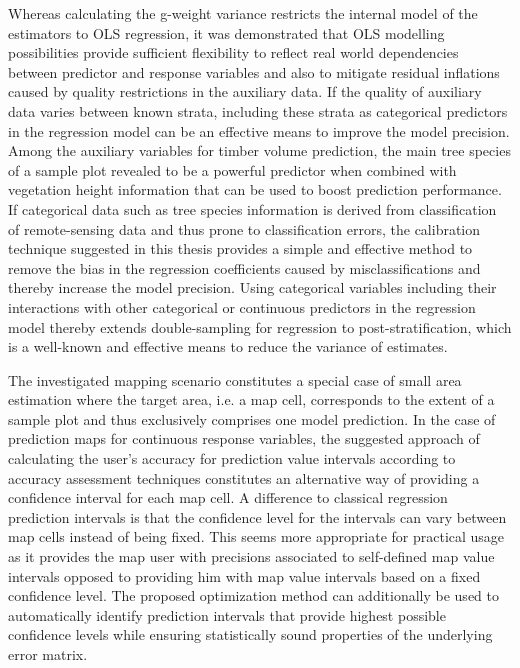 
Whereas calculating the g-weight variance restricts the internal model of the estimators to OLS regression, it was demonstrated that OLS modelling possibilities provide sufficient flexibility to reflect real world dependencies between predictor and response variables and also to mitigate residual inflations caused by quality restrictions in the auxiliary data. If the quality of auxiliary data varies between known strata, including these strata as categorical predictors in the regression model can be an effective means to improve the model precision. Among the auxiliary variables for timber volume prediction, the main tree species of a sample plot revealed to be a powerful predictor when combined with vegetation height information that can be used to boost prediction performance. If categorical data such as tree species information is derived from classification of remote-sensing data and thus prone to classification errors, the calibration technique suggested in this thesis provides a simple and effective method to remove the bias in the regression coefficients caused by misclassifications and thereby increase the model precision. Using categorical variables including their interactions with other categorical or continuous predictors in the regression model thereby extends double-sampling for regression to post-stratification, which is a well-known and effective means to reduce the variance of estimates.\par


The investigated mapping scenario constitutes a special case of small area estimation where the target area, i.e. a map cell, corresponds to the extent of a sample plot and thus exclusively comprises one model prediction. In the case of prediction maps for continuous response variables, the suggested approach of calculating the user's accuracy for prediction value intervals according to accuracy assessment techniques constitutes an alternative way of providing a confidence interval for each map cell. A difference to classical regression prediction intervals is that the confidence level for the intervals can vary between map cells instead of being fixed. This seems more appropriate for practical usage as it provides the map user with precisions associated to self-defined map value intervals opposed to providing him with map value intervals based on a fixed confidence level. The proposed optimization method can additionally be used to automatically identify prediction intervals that provide highest possible confidence levels while ensuring statistically sound properties of the underlying error matrix. 



